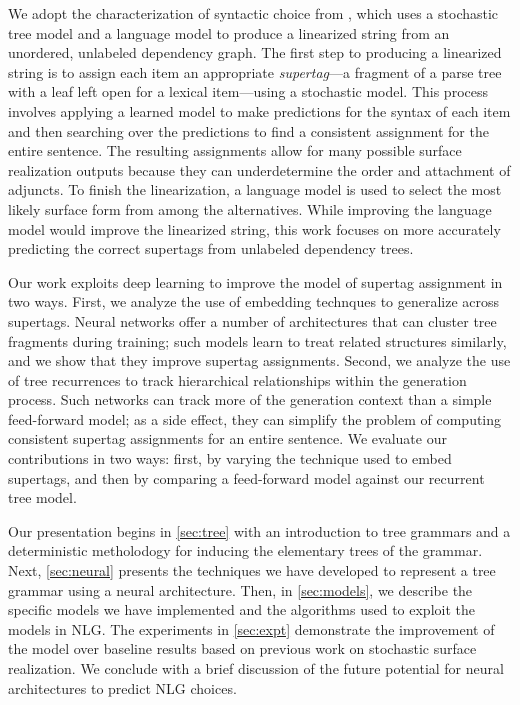 \documentclass[11pt]{article}
\begin{document}
We adopt the characterization of syntactic choice from
, which uses a stochastic tree model
and a language model to produce a linearized string from an unordered,
unlabeled dependency graph.
%
The first step to producing a linearized string is to assign each item
an appropriate \emph{supertag}---a fragment of a parse tree with a
leaf left open for a lexical item---using a stochastic model.
%
This process involves applying a learned model to make predictions for
the syntax of each item and then searching over the predictions to
find a consistent assignment for the entire sentence.
%
The resulting assignments allow for many possible surface realization
outputs because they can underdetermine the order and attachment of
adjuncts.
%
To finish the linearization, a language model is used to select the
most likely surface form from among the alternatives.
%
While improving the language model would improve the linearized string,
this work focuses on more accurately predicting the correct supertags from
unlabeled dependency trees.

Our work exploits deep learning to improve the model of supertag
assignment in two ways.
%
First, we analyze the use of embedding technques to generalize across
supertags.  
%
Neural networks offer a number of architectures that can cluster tree
fragments during training; such models learn to treat related structures
similarly, and we show that they improve supertag assignments.
%
Second, we analyze the use of tree recurrences to track hierarchical
relationships within the generation process.
%
Such networks can track more of the generation context than a simple
feed-forward model; as a side effect, they can simplify the problem of
computing consistent supertag assignments for an entire sentence.
%
We evaluate our contributions in two ways: first, by varying the
technique used to embed supertags, and then by comparing a
feed-forward model against our recurrent tree model.

Our presentation begins in \ref{sec:tree} with an introduction to tree
grammars and a deterministic metholodogy for inducing the elementary
trees of the grammar.
%
Next, \ref{sec:neural} presents the techniques we have developed to
represent a tree grammar using a neural architecture.
%
Then, in \ref{sec:models}, we describe the specific models we have
implemented and the algorithms used to exploit the models in NLG.
%
The experiments in \ref{sec:expt} demonstrate the improvement of the
model over baseline results based on previous work on stochastic
surface realization.
%
We conclude with a brief discussion of the future potential for neural
architectures to predict NLG choices.
\end{document}
